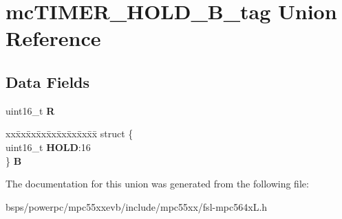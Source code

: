 \hypertarget{unionmcTIMER__HOLD__16B__tag}{}\section{mc\+T\+I\+M\+E\+R\+\_\+\+H\+O\+L\+D\+\_\+B\+\_\+tag Union Reference}
\label{unionmcTIMER__HOLD__16B__tag}
\subsection*{Data Fields}
\begin{DoxyCompactItemize}
\item 
\mbox{\label{unionmcTIMER__HOLD__16B__tag_aeb5c52a73b8c1991b9970edf0074234f}} 
uint16\+\_\+t {\bfseries R}
\item 
\mbox{\label{unionmcTIMER__HOLD__16B__tag_a749c71617a3c29ea3289a2685c8260c4}} 
\begin{tabbing}
xx\=xx\=xx\=xx\=xx\=xx\=xx\=xx\=xx\=\kill
struct \{\\
\>uint16\_t {\bfseries HOLD}:16\\
\} {\bfseries B}\\

\end{tabbing}\end{DoxyCompactItemize}


The documentation for this union was generated from the following file\+:\begin{DoxyCompactItemize}
\item 
bsps/powerpc/mpc55xxevb/include/mpc55xx/fsl-\/mpc564x\+L.\+h\end{DoxyCompactItemize}
